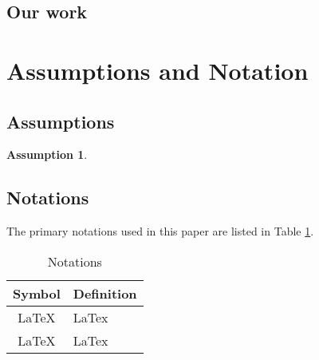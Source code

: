 \documentclass[12pt]{article}  %
\begin{document}
\subsection{Our work}







\section{Assumptions and Notation}
\subsection{Assumptions}



\newtheorem{assumption}{Assumption}[subsection]
\begin{assumption}

\end{assumption}

\subsection{Notations}
The primary notations used in this paper are listed in Table \ref{tb:notation}.

\begin{table}[H]
\begin{center}
\caption{Notations}
\begin{tabular}{cl}
	\toprule
	\multicolumn{1}{m{3cm}}{\textbf{Symbol}}
	&\multicolumn{1}{m{8cm}}{\textbf{Definition}}\\
	\midrule
	\multicolumn{1}{m{3cm}}{\LaTeX}&LaTex\\
   \multicolumn{1}{m{3cm}}{\LaTeX}&LaTex\\


	\bottomrule
\end{tabular}\label{tb:notation}
\end{center}
\end{table}
\end{document}
